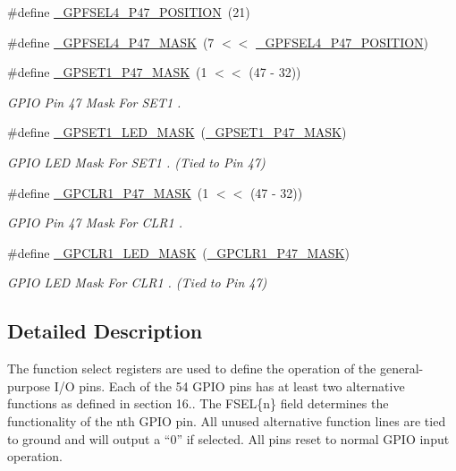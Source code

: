 \begin{DoxyCompactItemize}
\#define \hyperlink{group__GPIO_ga632b6a16f6d3262bfaa31eb0c6b32148}{\+\_\+\+G\+P\+F\+S\+E\+L4\+\_\+\+P47\+\_\+\+P\+O\+S\+I\+T\+I\+ON}~(21)
\item 
\#define \hyperlink{group__GPIO_ga467fb29f325faaae76ff76c5a626eda1}{\+\_\+\+G\+P\+F\+S\+E\+L4\+\_\+\+P47\+\_\+\+M\+A\+SK}~(7 $<$$<$ \hyperlink{group__GPIO_ga632b6a16f6d3262bfaa31eb0c6b32148}{\+\_\+\+G\+P\+F\+S\+E\+L4\+\_\+\+P47\+\_\+\+P\+O\+S\+I\+T\+I\+ON})
\item 
\#define \hyperlink{group__GPIO_ga4cf59dbaa88390cfa9c359b86bd4f6cd}{\+\_\+\+G\+P\+S\+E\+T1\+\_\+\+P47\+\_\+\+M\+A\+SK}~(1 $<$$<$ (47 -\/ 32))
\begin{DoxyCompactList}\small\item\em G\+P\+IO Pin 47 Mask For {\ttfamily S\+E\+T1} {\ttfamily }. \end{DoxyCompactList}\item 
\#define \hyperlink{group__GPIO_ga2f3bb20af38da2c67892bf8856c6991e}{\+\_\+\+G\+P\+S\+E\+T1\+\_\+\+L\+E\+D\+\_\+\+M\+A\+SK}~(\hyperlink{group__GPIO_ga4cf59dbaa88390cfa9c359b86bd4f6cd}{\+\_\+\+G\+P\+S\+E\+T1\+\_\+\+P47\+\_\+\+M\+A\+SK})
\begin{DoxyCompactList}\small\item\em G\+P\+IO L\+ED Mask For {\ttfamily S\+E\+T1} {\ttfamily }. (Tied to Pin 47) \end{DoxyCompactList}\item 
\#define \hyperlink{group__GPIO_gad929eafe7e55e1d2835b8a2f081cf34c}{\+\_\+\+G\+P\+C\+L\+R1\+\_\+\+P47\+\_\+\+M\+A\+SK}~(1 $<$$<$ (47 -\/ 32))
\begin{DoxyCompactList}\small\item\em G\+P\+IO Pin 47 Mask For {\ttfamily C\+L\+R1} {\ttfamily }. \end{DoxyCompactList}\item 
\#define \hyperlink{group__GPIO_ga7fc9bde0af3fa38b5a30933abc6e9dbd}{\+\_\+\+G\+P\+C\+L\+R1\+\_\+\+L\+E\+D\+\_\+\+M\+A\+SK}~(\hyperlink{group__GPIO_gad929eafe7e55e1d2835b8a2f081cf34c}{\+\_\+\+G\+P\+C\+L\+R1\+\_\+\+P47\+\_\+\+M\+A\+SK})
\begin{DoxyCompactList}\small\item\em G\+P\+IO L\+ED Mask For {\ttfamily C\+L\+R1} {\ttfamily }. (Tied to Pin 47) \end{DoxyCompactList}\end{DoxyCompactItemize}


\subsection{Detailed Description}
The function select registers are used to define the operation of the general-\/purpose I/O pins. Each of the 54 G\+P\+IO pins has at least two alternative functions as defined in section 16.. The F\+S\+EL\{n\} field determines the functionality of the nth G\+P\+IO pin. All unused alternative function lines are tied to ground and will output a “0” if selected. All pins reset to normal G\+P\+IO input operation. 

